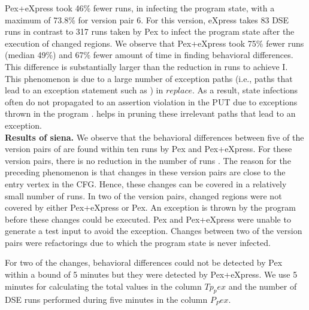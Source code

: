 Pex+eXpress took 46\% fewer runs, in infecting the program state, with a maximum of 73.8\% for version pair 6. For this version, eXpress takes 83 DSE runs in contrast to 317 runs taken by Pex to infect the program state after the execution of changed regions. We observe that Pex+eXpress took 75\% fewer runs (median 49\%) and 67\% fewer amount of time in finding behavioral differences. This difference is substantially larger than the reduction in runs to achieve I. This phenomenon is due to a large number of 
exception paths (i.e., paths that lead to an exception statement such as ) in $replace$. As a result, state infections often do not propagated 
to an assertion violation in the PUT due to exceptions thrown in the program .  helps in pruning these irrelevant paths that lead to an exception.   
\\ \textbf{Results of siena. }We observe that the behavioral differences between five of the version pairs of  are found within ten runs by Pex and Pex+eXpress. For these version pairs, there is no reduction in the number of runs . The reason for the preceding phenomenon is that changes in these version pairs are close to the entry vertex in the CFG. Hence, these changes can be covered in a relatively small number of runs.  In two of the version pairs, changed regions were not covered by either Pex+eXpress or Pex. An exception is thrown by the program before these changes could be executed. Pex and  Pex+eXpress were unable to generate a test input to avoid the exception. Changes between two of the version pairs were refactorings due to which the program state is never infected.

For two of the changes, behavioral differences could not be detected by Pex within a bound of 5 minutes but they were detected by Pex+eXpress. We use 5 minutes for calculating the total values in the column $Tp_pex$ and the number of DSE runs performed during five minutes in the column $P_Pex$.  

